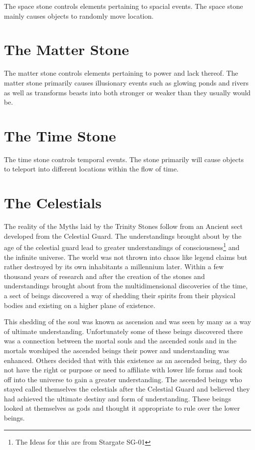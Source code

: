 The space stone controls elements pertaining to spacial events. The space stone mainly causes objects to randomly move location.


\section{The Matter Stone}

The matter stone controls elements pertaining to power and lack thereof. The matter stone primarily causes illusionary events such as glowing ponds and rivers as well as transforms beasts into both stronger or weaker than they usually would be.

\section{The Time Stone}

The time stone controls temporal events. The stone primarily will cause objects to teleport into different locations within the flow of time.

\section{The Celestials}

The reality of the Myths laid by the Trinity Stones follow from an Ancient sect developed from the Celestial Guard. The understandings brought about by the age of the celestial guard lead to greater understandings of consciousness\footnote{The Ideas for this are from Stargate SG-01} and the infinite universe. The world was not thrown into chaos like legend claims but rather destroyed by its own inhabitants a millennium later. Within a few thousand years of research and after the creation of the stones and understandings brought about from the multidimensional discoveries of the time, a sect of beings discovered a way of shedding their spirits from their physical bodies and existing on a higher plane of existence. 

This shedding of the soul was known as ascension and was seen by many as a way of ultimate understanding. Unfortunately some of these beings discovered there was a connection between the mortal souls and the ascended souls and in the mortals worshiped the ascended beings their power and understanding was enhanced. Others decided that with this existence as an ascended being, they do not have the right or purpose or need to affiliate with lower life forms and took off into the universe to gain a greater understanding. The ascended beings who stayed called themselves the celestials after the Celestial Guard and believed they had achieved the ultimate destiny and form of understanding. These beings looked at themselves as gods and thought it appropriate to rule over the lower beings.

